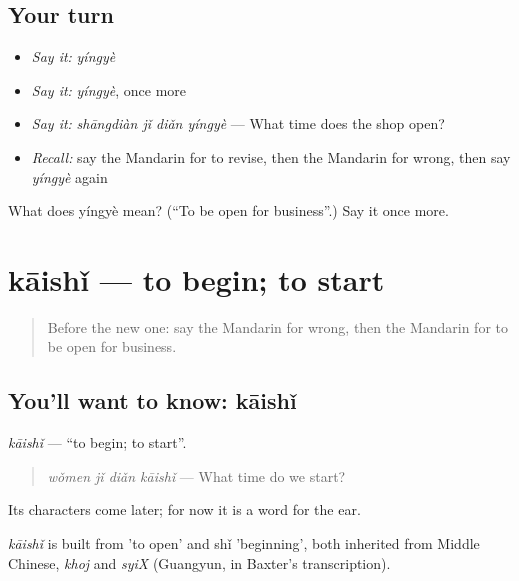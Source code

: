 \subsection*{Your turn}
\begin{itemize}
\raggedright
  \item \emph{Say it:} \emph{yíngyè}
  \item \emph{Say it:} \emph{yíngyè}, once more
  \item \emph{Say it:} \emph{shāngdiàn jǐ diǎn yíngyè} — What time does the shop open?
  \item \emph{Recall:} say the Mandarin for to revise, then the Mandarin for wrong, then say \emph{yíngyè} again
\end{itemize}

\begin{tcolorbox}[breakable,colback=teal!4,colframe=teal!35!black,title={Before you move on}]
What does yíngyè mean? (\textquotedblleft{}To be open for business\textquotedblright{}.) Say it once more.
\end{tcolorbox}
\section[kāishǐ]{kāishǐ — to begin; to start}

\label{lesson:ZH-C122-kaishi}



\begin{quote}
Before the new one: say the Mandarin for wrong, then the Mandarin for to be open for business.
\end{quote}

\subsection*{You'll want to know: kāishǐ}
\emph{kāishǐ} — \textquotedblleft{}to begin; to start\textquotedblright{}.

\begin{quote}
\emph{wǒmen jǐ diǎn kāishǐ} — What time do we start?
\end{quote}

Its characters come later; for now it is a word for the ear.

\begin{cousinweb}
\emph{kāishǐ} is built from  'to open' and shǐ 'beginning', both inherited from Middle Chinese, \emph{khoj} and \emph{syiX} (Guangyun, in Baxter's transcription).
\end{cousinweb}

